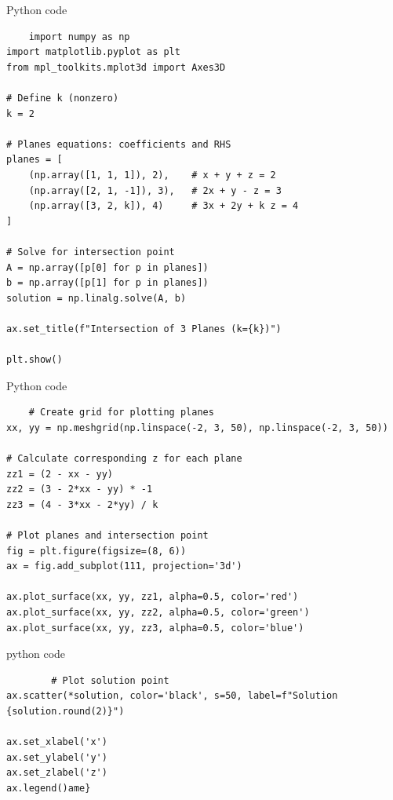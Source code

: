 \documentclass{beamer}
\begin{document}
\begin{frame}[fragile]{Python code}
\begin{lstlisting}
    import numpy as np
import matplotlib.pyplot as plt
from mpl_toolkits.mplot3d import Axes3D

# Define k (nonzero)
k = 2

# Planes equations: coefficients and RHS
planes = [
    (np.array([1, 1, 1]), 2),    # x + y + z = 2
    (np.array([2, 1, -1]), 3),   # 2x + y - z = 3
    (np.array([3, 2, k]), 4)     # 3x + 2y + k z = 4
]

# Solve for intersection point
A = np.array([p[0] for p in planes])
b = np.array([p[1] for p in planes])
solution = np.linalg.solve(A, b)

ax.set_title(f"Intersection of 3 Planes (k={k})")

plt.show()

\end{lstlisting}
\end{frame}

\begin{frame}[fragile]{Python code}
\begin{lstlisting}
    # Create grid for plotting planes
xx, yy = np.meshgrid(np.linspace(-2, 3, 50), np.linspace(-2, 3, 50))

# Calculate corresponding z for each plane
zz1 = (2 - xx - yy)
zz2 = (3 - 2*xx - yy) * -1
zz3 = (4 - 3*xx - 2*yy) / k

# Plot planes and intersection point
fig = plt.figure(figsize=(8, 6))
ax = fig.add_subplot(111, projection='3d')

ax.plot_surface(xx, yy, zz1, alpha=0.5, color='red')
ax.plot_surface(xx, yy, zz2, alpha=0.5, color='green')
ax.plot_surface(xx, yy, zz3, alpha=0.5, color='blue')
\end{lstlisting}
\end{frame}

\begin{frame}[fragile]{python code}
    \begin{lstlisting}
        # Plot solution point
ax.scatter(*solution, color='black', s=50, label=f"Solution {solution.round(2)}")

ax.set_xlabel('x')
ax.set_ylabel('y')
ax.set_zlabel('z')
ax.legend()ame}
    \end{lstlisting}
\end{frame}
\end{document}
